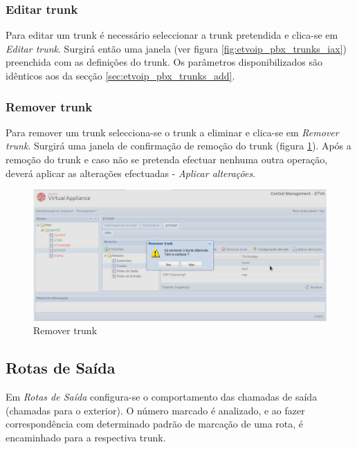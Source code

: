 \subsubsection{Editar trunk}

Para editar um trunk é necessário seleccionar a trunk pretendida e clica-se em \emph{Editar trunk}. Surgirá então uma janela (ver figura \ref{fig:etvoip_pbx_trunks_iax}) preenchida com as definições do trunk.
Os parâmetros disponibilizados são idênticos aos da secção \ref{sec:etvoip_pbx_trunks_add}.

\subsubsection{Remover trunk}

Para remover um trunk selecciona-se o trunk a eliminar e clica-se em \emph{Remover trunk}.
Surgirá uma janela de confirmação de remoção do trunk (figura \ref{fig:etvoip_pbx_trunks_remove}). Após a remoção do trunk e caso não se pretenda efectuar nenhuma outra operação, deverá aplicar as alterações efectuadas - \emph{Aplicar alterações}.

\begin{figure}[H]
        \begin{center}
        \includegraphics[scale=0.4]{screenshots/etvoip_pbx_trunks_remove.png}
        \caption{Remover trunk}
        \label{fig:etvoip_pbx_trunks_remove}
        \end{center}
\end{figure}


\subsection{Rotas de Saída}

Em \emph{Rotas de Saída} configura-se o comportamento das chamadas de saída (chamadas para o exterior). O número marcado é analizado, e ao fazer correspondência
com determinado padrão de marcação de uma rota, é encaminhado para a respectiva trunk.

